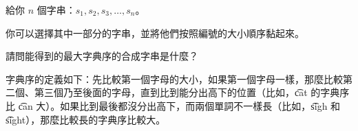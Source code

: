 給你 $n$ 個字串：$s_1, s_2, s_3, \ldots, s_n$。

你可以選擇其中一部分的字串，並將他們按照編號的大小順序黏起來。

請問能得到的最大字典序的合成字串是什麼？

字典序的定義如下：先比較第一個字母的大小，如果第一個字母一樣，那麼比較第二個、第三個乃至後面的字母，直到比到能分出高下的位置（比如，\t{cat} 的字典序比 \t{can} 大）。如果比到最後都沒分出高下，而兩個單詞不一樣長（比如，\t{sigh} 和 \t{sight}），那麼比較長的字典序比較大。
